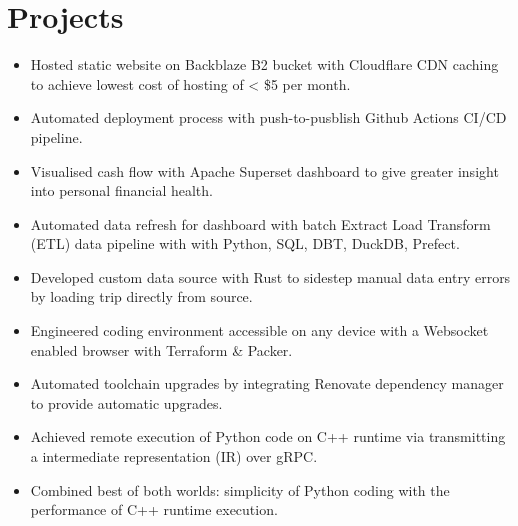 \section{Projects}
\begin{itemize}
  \item Hosted static website on Backblaze B2 bucket with Cloudflare CDN caching to achieve lowest cost of hosting of < \$5 per month.
  \item Automated deployment process with push-to-pusblish Github Actions CI/CD pipeline.
\end{itemize}
\begin{itemize}
  \item Visualised cash flow with Apache Superset dashboard to give greater insight into personal financial health.
  \item Automated data refresh for dashboard with batch Extract Load Transform (ETL) data pipeline with with Python, SQL, DBT, DuckDB, Prefect.
  \item Developed custom data source with Rust to sidestep manual data entry errors by loading trip directly from source.
\end{itemize}
\begin{itemize}
  \item Engineered coding environment accessible on any device with a Websocket enabled browser with Terraform \& Packer.
  \item Automated toolchain upgrades by integrating Renovate dependency manager to provide automatic upgrades.
\end{itemize}
\begin{itemize}
  \item Achieved remote execution of Python code on C++ runtime via transmitting a intermediate representation (IR) over gRPC.
  \item Combined best of both worlds: simplicity of Python coding with the performance of C++ runtime execution.
\end{itemize}

